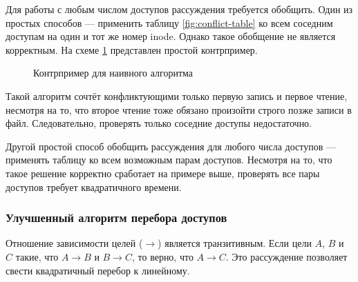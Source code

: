 Для работы с любым числом доступов рассуждения требуется обобщить. Один из простых способов --- применить таблицу \ref{fig:conflict-table} ко всем соседним доступам на один и тот же номер inode. Однако такое обобщение не является корректным. На схеме \ref{fig:naive-conflict-break} представлен простой контрпример.

\begin{figure}[H]
    \centering
    \caption{Контрпример для наивного алгоритма}
    \label{fig:naive-conflict-break}
\end{figure}

Такой алгоритм сочтёт конфликтующими только первую запись и первое чтение, несмотря на то, что второе чтение тоже обязано произойти строго позже записи в файл. Следовательно, проверять только соседние доступы недостаточно.

Другой простой способ обобщить рассуждения для любого числа доступов --- применять таблицу ко всем возможным парам доступов. Несмотря на то, что такое решение корректно сработает на примере выше, проверять все пары доступов требует квадратичного времени.

\subsubsection{Улучшенный алгоритм перебора доступов}
\label{subsubsec:linear-time-proof}

Отношение зависимости целей ($\rightarrow$) является транзитивным. Если цели $A$, $B$ и $C$ такие, что $A \rightarrow B$ и $B \rightarrow C$, то верно, что $A \rightarrow C$. Это рассуждение позволяет свести квадратичный перебор к линейному.

